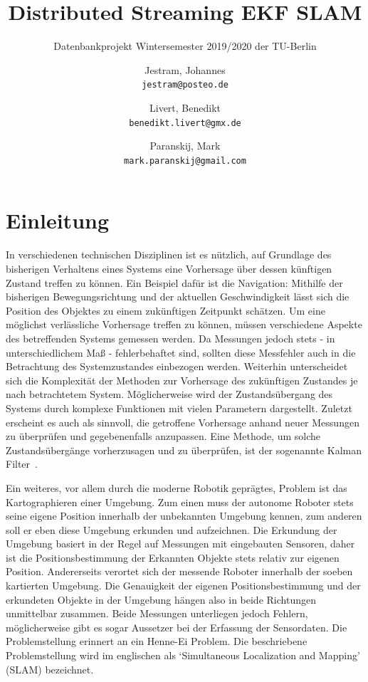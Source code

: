 \documentclass[11pt]{scrartcl}
\author{
  	Jestram, Johannes\\
  	\texttt{jestram@posteo.de}
	\and
	Livert, Benedikt\\
	\texttt{benedikt.livert@gmx.de}
	\and
	Paranskij, Mark\\
	\texttt{mark.paranskij@gmail.com}
}
\title{Distributed Streaming EKF SLAM}
\subtitle{Datenbankprojekt Wintersemester 2019/2020 der TU-Berlin}
\begin{document}
\maketitle
\newpage

\tableofcontents
\newpage

\section{Einleitung}\label{Einleitung}
In verschiedenen technischen Disziplinen ist es nützlich, auf Grundlage des bisherigen Verhaltens eines Systems eine Vorhersage über dessen künftigen Zustand treffen zu können. Ein Beispiel dafür ist die Navigation: Mithilfe der bisherigen Bewegungsrichtung und der aktuellen Geschwindigkeit lässt sich die Position des Objektes zu einem zukünftigen Zeitpunkt schätzen. Um eine möglichst verlässliche Vorhersage treffen zu können, müssen verschiedene Aspekte des betreffenden Systems gemessen werden. Da Messungen jedoch stets - in unterschiedlichem Maß - fehlerbehaftet sind, sollten diese Messfehler auch in die Betrachtung des Systemzustandes einbezogen werden. Weiterhin unterscheidet sich die Komplexität der Methoden zur Vorhersage des zukünftigen Zustandes je nach betrachtetem System. Möglicherweise wird der Zustandsübergang des Systems durch komplexe Funktionen mit vielen Parametern dargestellt. Zuletzt erscheint es auch als sinnvoll, die getroffene Vorhersage anhand neuer Messungen zu überprüfen und gegebenenfalls anzupassen. Eine Methode, um solche Zustandsübergänge vorherzusagen und zu überprüfen, ist der sogenannte Kal\-man Filter~\cite{kalman1960new}.

Ein weiteres, vor allem durch die moderne Robotik geprägtes, Problem ist das Kartographieren einer Umgebung. Zum einen muss der autonome Roboter stets seine eigene Position innerhalb der unbekannten Umgebung kennen, zum anderen soll er eben diese Umgebung erkunden und aufzeichnen. Die Erkundung der Umgebung basiert in der Regel auf Messungen mit eingebauten Sensoren, daher ist die Positionsbestimmung der Erkannten Objekte stets relativ zur eigenen Position. Andererseits verortet sich der messende Roboter innerhalb der soeben kartierten Umgebung. Die Genauigkeit der eigenen Positionsbestimmung und der erkundeten Objekte in der Umgebung hängen also in beide Richtungen unmittelbar zusammen. Beide Messungen unterliegen jedoch Fehlern, möglicherweise gibt es sogar Aussetzer bei der Erfassung der Sensordaten. Die Problemstellung erinnert an ein Henne-Ei Problem. Die beschriebene Problemstellung wird im englischen als ‘Simultaneous Localization and Mapping’ (SLAM) bezeichnet.
\end{document}
